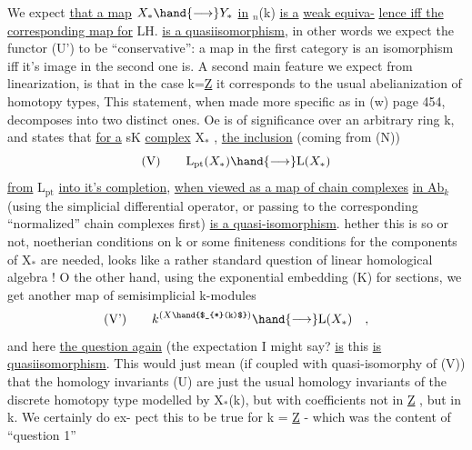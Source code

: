 We expect \uline{that a map} $X_{*} \hand{\longrightarrow} Y_{*}$ \uline{in} $_n$(k) \uline{is a}  \uline{weak equiva-}%
\uline{lence iff the corresponding map for} LH. \uline{is a quasiisomorphism}, in other
words we expect the functor (U') to be ``conservative'': a map in the
first category is an isomorphism iff it's image in the second one is.
A second main feature we expect from linearization, is that in the case
k=\underline{Z} it corresponds to the usual abelianization of homotopy types, This
statement, when made more specific as in (w) page 454, decomposes into
two distinct ones. Oe is of significance over an arbitrary ring k,
and states that \uline{for a} sK \uline{complex} X$_{*}$ , \uline{the inclusion} (coming from (N))
\[ \text{(V)} \qquad \mathrm{L}_{\mathrm{pt}}(X_{*}) \hand{\longrightarrow} \mathrm{L}(X_{*}) \] 
\uline{from} L$_{\mathrm{pt}}$ \uline{into it's completion}, \uline{when viewed as a map of chain complexes}
\uline{in Ab$_k$} (using the simplicial differential operator, or passing to the
corresponding ``normalized'' chain complexes first) \uline{is a quasi-isomorphism}.
hether this is  so or not,    noetherian conditions on k or some 
finiteness conditions for the components of X$_{*}$ are needed, looks like a
rather standard question of linear homological algebra ! O the other
hand, using the exponential embedding (K) for sections, we get another
map  of semisimplicial k-modules
\[ \text{(V')} \qquad k^{(X\hand{$_{*}(k)$})} \hand{\longrightarrow} \mathrm{L}(X_{*}) \quad , \] 
and here \uline{the question again} (the expectation I might say?\hand{)} \uline{is}   this
\uline{is   quasiisomorphism}. This would just mean  (if coupled with
quasi-isomorphy of (V)) that the homology invariants (U) are just the
usual homology invariants of the discrete homotopy type modelled by
X$_{*}$(k), but with coefficients not in \underline{Z} , but in k. We certainly do ex-%
pect this to be true for k = \underline{Z} - which was the content of ``question 1''



